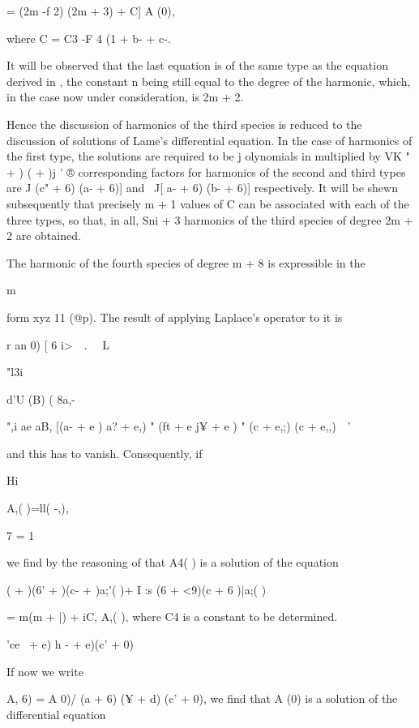 {= (2m -f 2) (2m + 3) + C] A (0),

where C = C3 -F 4 (1 + b- + c-.

It will be observed that the last equation is of the same type as the
equation derived in , the constant n being still equal to the
degree of the harmonic, which, in the case now under consideration, is
2m + 2.

Hence the discussion of harmonics of the third species is reduced to
the discussion of solutions of Lame's differential equation. In the
case of harmonics of the first type, the solutions are required to be
j olynomials in multiplied by VK " + ) ( + )j ' ® corresponding
factors for harmonics of the second and third types are J (c" + 6) (a-
+ 6)] and \ J[ a- + 6) (b- + 6)] respectively. It will be shewn
subsequently that precisely m + 1 values of C can be associated with
each of the three types, so that, in all, Sni + 3 harmonics of the
third species of degree 2m + 2 are obtained.


The harmonic of the fourth species of degree m + 8 is expressible in
the

m

form xyz 11 (@p). The result of applying Laplace's operator to it is

r an 0) [ 6 i>\ \ . \ \ L

"l3i %

  d'U (B) ( 8a,- \ %

",i ae aB, [(a- + e ) a? + e,) " (ft + e j¥ + e ) " (c + e,;) (c +
e,,)\ \ '

and this has to vanish. Consequently, if

Hi

A,( )=ll( -,),

7 = 1

we find by the reasoning of  that A4( ) is a solution of the
equation

( + )(6' + )(c- + )a;'( )+ I :s (6 + <9)(c + 6 )|a;( )

= m(m + |) + iC, A,( ), where C4 is a constant to be determined.

 'ce~ + e) h - + e)(c' + 0) ~

%
%

If now we write

A, 6) = A 0)/ (a + 6) (¥ + d) (c' + 0), we find that A (0) is a
solution of the differential equation

}
